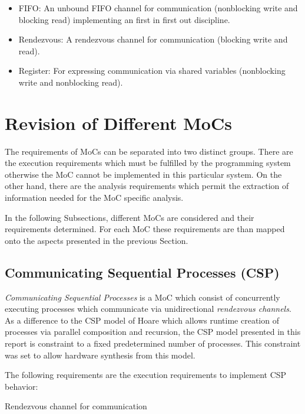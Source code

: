 \begin{itemize}
\item \label{channel-kind-fifo} FIFO:
  An unbound FIFO channel for communication
  (nonblocking write and blocking read) implementing
  an first in first out discipline.

\item \label{channel-kind-rendezvous} Rendezvous:
  A rendezvous channel for communication %
  (blocking write and read).

\item \label{channel-kind-register} Register:
  For expressing communication via shared variables
  (nonblocking write and nonblocking read).
\end{itemize}

\section{Revision of Different MoCs}\label{revision-of-mocs}

The requirements of MoCs can be separated into two distinct groups.
There are the execution requirements which must be fulfilled by
the programming system otherwise the MoC cannot be implemented in
this particular system.
On the other hand, there are the analysis requirements which
permit the extraction of information needed for the MoC specific analysis.

In the following Subsections, different MoCs are considered and their
requirements determined. For each MoC these requirements are than
mapped onto the aspects presented in the previous Section.

\subsection{Communicating Sequential Processes (CSP)}
\emph{Communicating Sequential Processes} \cite{csphoare:1985}
is a MoC which consist of concurrently executing processes
which communicate via unidirectional \emph{rendezvous channels}.
As a difference to the CSP model of Hoare \cite{csphoare:1985}
which allows runtime creation of processes via parallel
composition and recursion, the CSP model presented in this report
is constraint to a fixed predetermined number of processes.
This constraint was set to allow hardware synthesis from this
model.

The following requirements are the execution requirements to
implement CSP behavior:

\begin{requirement}\label{requirement-csp-rendezvous}
  Rendezvous channel for communication
\end{requirement}


